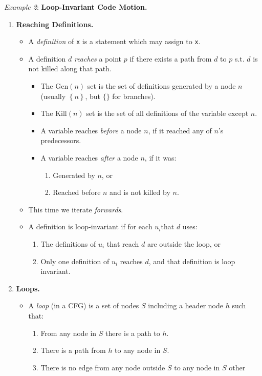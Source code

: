 \documentclass[twocolumn,english]{article}
\begin{document}
\emph{Example 2}: \textbf{Loop-Invariant Code Motion.}
\begin{enumerate}
\item \textbf{Reaching Definitions.}
\begin{itemize}
\item A \emph{definition} of \texttt{x} is a statement which may assign
to \texttt{x}.
\item A definition $d$ \emph{reaches} a point $p$ if there exists a path
from $d$ to $p$ s.t. $d$ is not killed along that path.
\begin{itemize}
\item The $\text{Gen}\left(n\right)$ set is the set of definitions generated
by a node $n$ (usually $\left\{ n\right\} $, but $\{\}$ for branches).
\item The $\text{Kill}\left(n\right)$ set is the set of all definitions
of the variable except $n$.
\item A variable reaches \emph{before} a node $n$, if it reached any of
$n$'s predecessors.
\item A variable reaches \emph{after} a node $n$, if it was:
\begin{enumerate}
\item Generated by $n$, or
\item Reached before $n$ and is not killed by $n$.
\end{enumerate}
\end{itemize}
\item This time we iterate \emph{forwards}.
\item A definition is loop-invariant if for each $u_{i}$that $d$ uses:
\begin{enumerate}
\item The definitions of $u_{i}$ that reach $d$ are outside the loop,
or
\item Only one definition of $u_{i}$ reaches $d$, and that definition
is loop invariant.
\end{enumerate}
\end{itemize}
\item \textbf{Loops.}
\begin{itemize}
\item A \emph{loop} (in a CFG) is a set of nodes $S$ including a header
node $h$ such that:
\begin{enumerate}
\item From any node in $S$ there is a path to $h$.
\item There is a path from $h$ to any node in $S$.
\item There is no edge from any node outside $S$ to any node in $S$ other

\end{enumerate}
\end{itemize}
\end{enumerate}
\end{document}
